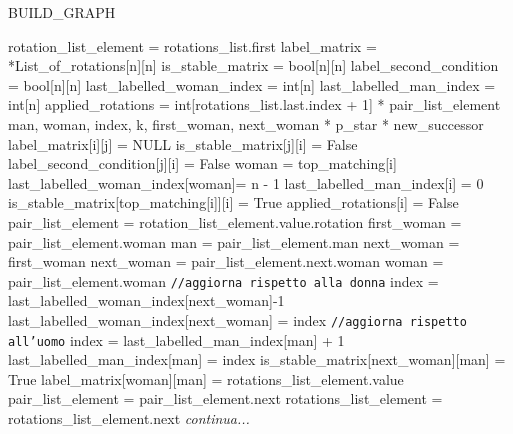 \documentclass[12pt]{article}
\begin{document}
    \begin{algorithm}[H]
        \scriptsize
        \DontPrintSemicolon
        \caption{BUILD\_GRAPH}\label{alg:BuildGraph}
        \;
        rotation\_list\_element = rotations\_list.first\;
        label\_matrix = *List\_of\_rotations[n][n]\;
        is\_stable\_matrix = bool[n][n]\;
        label\_second\_condition = bool[n][n]\;
        last\_labelled\_woman\_index = int[n]\;
        last\_labelled\_man\_index = int[n]\;
	applied\_rotations = int[rotations\_list.last.index + 1]\;
        * pair\_list\_element\;
        man, woman, index, k, first\_woman, next\_woman\;
        * p\_star\;
        * new\_successor\;
	 {
             {
		    label\_matrix[i][j] = NULL\;   
                is\_stable\_matrix[j][i] = False\;
                label\_second\_condition[j][i] = False\;
            }
            woman = top\_matching[i]\;
		last\_labelled\_woman\_index[woman]= n - 1\;
		last\_labelled\_man\_index[i] = 0\;
		is\_stable\_matrix[top\_matching[i]][i] = True\;
        }
	\;
	 {
		applied\_rotations[i] = False\;
        }
	\;
         {
		pair\_list\_element = rotation\_list\_element.value.rotation\;
            first\_woman = pair\_list\_element.woman\;
		 {
			man = pair\_list\_element.man\;
                 {
                    next\_woman = first\_woman\;
                }{
                    next\_woman = pair\_list\_element.next.woman\;                
                }
                woman = pair\_list\_element.woman\;
                \texttt{//aggiorna rispetto alla donna}\;
                index = last\_labelled\_woman\_index[next\_woman]-1\;
                last\_labelled\_woman\_index[next\_woman] = index\;
			\texttt{//aggiorna rispetto all'uomo}\;
			index = last\_labelled\_man\_index[man] + 1\;
			last\_labelled\_man\_index[man] = index\;
                \;
			is\_stable\_matrix[next\_woman][man] = True\;
			label\_matrix[woman][man] = rotations\_list\_element.value\;
			pair\_list\_element = pair\_list\_element.next\;
	    }
            rotations\_list\_element = rotations\_list\_element.next\;
        }
        \;
        \textit{continua...}
    \end{algorithm}
    
\end{document}
